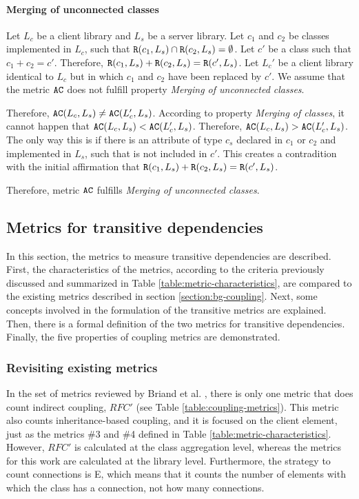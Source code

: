 \paragraph{Merging of unconnected classes}
Let $L_c$ be a client library and $L_s$ be a server library. Let $c_1$ and $c_2$ be classes implemented in $L_c$, such that $\verb|R|(c_1, L_s) \cap \verb|R|(c_2, L_s) = \emptyset$. Let $c'$ be a class such that $c_1 + c_2 = c'$. Therefore, $\verb|R|(c_1, L_s) + \verb|R|(c_2, L_s) = \verb|R|(c', L_s)$. Let $L_c'$ be a client library identical to $L_c$ but in which $c_1$ and $c_2$ have been replaced by $c'$. We assume that the metric $\verb|AC|$ does not fulfill property \textit{Merging of unconnected classes}.

Therefore, $\verb|AC|(L_c, L_s) \neq \verb|AC|(L_c', L_s)$. According to property \textit{Merging of classes}, it cannot happen that $\verb|AC|(L_c, L_s) < \verb|AC|(L_c', L_s)$. Therefore, $\verb|AC|(L_c, L_s) > \verb|AC|(L_c', L_s)$. The only way this is if there is an attribute of type $c_s$ declared in $c_1$ or $c_2$ and implemented in $L_s$, such that is not included in $c'$. This creates a contradition with the initial affirmation that $\verb|R|(c_1, L_s) + \verb|R|(c_2, L_s) = \verb|R|(c', L_s)$.

Therefore, metric $\verb|AC|$ fulfills \textit{Merging of unconnected classes}.

\subsection{Metrics for transitive dependencies}\label{subsect:defMetricsTransitive}
In this section, the metrics to measure transitive dependencies are described. First, the characteristics of the metrics, according to the criteria previously discussed and summarized in Table \ref{table:metric-characteristics}, are compared to the existing metrics described in section \ref{section:bg-coupling}. Next, some concepts involved in the formulation of the transitive metrics are explained. Then, there is a formal definition of the two metrics for transitive dependencies. Finally, the five properties of coupling metrics are demonstrated.

\subsubsection{Revisiting existing metrics}
In the set of metrics reviewed by Briand et al. \cite{briand1999unified}, there is only one metric that does count indirect coupling, $RFC'$ (see Table \ref{table:coupling-metrics}). This metric also counts inheritance-based coupling, and it is focused on the client element, just as the metrics \#3 and \#4 defined in Table \ref{table:metric-characteristics}. However, $RFC'$ is calculated at the class aggregation level, whereas the metrics for this work are calculated at the library level. Furthermore, the strategy to count connections is E, which means that it counts the number of elements with which the class has a connection, not how many connections.

